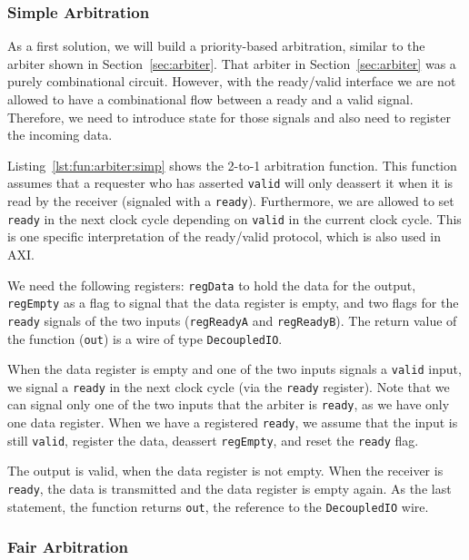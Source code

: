 \documentclass[%
    10pt,
    headinclude, footexclude,
    openright, %
    notitlepage,
    cleardoubleempty,
    headsepline,
    pointlessnumbers,
    bibtotoc, idxtotoc,
    ]{scrbook}
\newcommand{\code}[1]{{\small{\texttt{#1}}}}
\begin{document}
\subsubsection{Simple Arbitration}

As a first solution, we will build a priority-based arbitration, similar to the arbiter shown
in Section~\ref{sec:arbiter}. That arbiter in Section~\ref{sec:arbiter} was a purely combinational circuit.
However, with the ready/valid interface we are not allowed to have a combinational
flow between a ready and a valid signal. Therefore, we need to introduce state for those signals
and also need to register the incoming data.

Listing~\ref{lst:fun:arbiter:simp} shows the 2-to-1 arbitration function. This function assumes
that a requester who has asserted \code{valid} will only deassert it when it is read by the receiver
(signaled with a \code{ready}). Furthermore, we are allowed to set \code{ready} in the next clock cycle
depending on \code{valid} in the current clock cycle.
This is one specific interpretation of the ready/valid protocol, which is also used in AXI.


We need the following registers: \code{regData} to hold the data for the output, \code{regEmpty} as a  flag to
signal that the data register is empty, and two flags for the \code{ready} signals of the two inputs
(\code{regReadyA} and \code{regReadyB}).
The return value of the function (\code{out}) is a wire of type \code{DecoupledIO}.

When the data register is empty and one of the two inputs signals a \code{valid} input,
we signal a \code{ready} in the next clock cycle (via the \code{ready} register).
Note that we can signal only one of the two inputs that the arbiter is \code{ready},
as we have only one data register.
When we have a registered \code{ready}, we assume that the input is still \code{valid},
register the data, deassert \code{regEmpty}, and reset the \code{ready} flag.

The output is valid, when the data register is not empty. When the receiver is \code{ready},
the data is transmitted and the data register is empty again.
As the last statement, the function returns \code{out}, the reference to the \code{DecoupledIO}
wire.


\subsubsection{Fair Arbitration}
\end{document}
